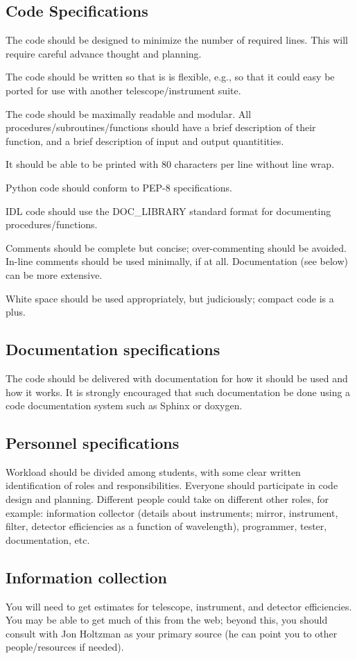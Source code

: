 \documentclass[12pt]{article}
\begin{document}
\subsection*{Code Specifications}
The code should be designed to minimize the number of required lines.
This will require careful advance thought and planning.

The code should be written so that is is flexible, e.g., so that it
could easy be ported for use with another telescope/instrument suite.

The code should be maximally readable and modular. All
procedures/subroutines/functions should have a brief description of
their function, and a brief description of input and output
quantitities.

It should be able to be printed with 80 characters per line without
line wrap.

Python code should conform to PEP-8 specifications.

IDL code should use the DOC\_LIBRARY standard format for documenting
procedures/functions.

Comments should be complete but concise; over-commenting should be
avoided. In-line comments should be used minimally, if at all.
Documentation (see below) can be more extensive.

White space should be used appropriately, but judiciously; compact
code is a plus. 

\subsection*{Documentation specifications}
The code should be delivered with documentation for how it should be
used and how it works. It is strongly encouraged that such
documentation be done using a code documentation system such as Sphinx
or doxygen.

\subsection*{Personnel specifications}
Workload should be divided among students, with some clear written
identification of roles and responsibilities. Everyone should
participate in code design and planning. Different people could take
on different other roles, for example: information collector (details
about instruments; mirror, instrument, filter, detector efficiencies
as a function of wavelength), programmer, tester, documentation, etc.

\subsection*{Information collection}
 You will need to get estimates for telescope, instrument, and
 detector efficiencies. You may be able to get much of this from the
 web; beyond this, you should consult with Jon Holtzman as your
 primary source (he can point you to other people/resources if
 needed).
\end{document}
